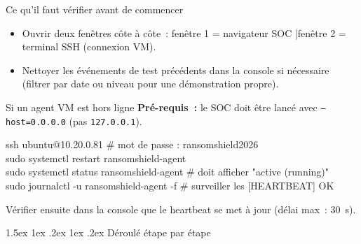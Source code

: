 \documentclass[a4paper,11pt]{article}
\makeatletter
\renewcommand{\section}{\@startsection{section}{1}{\z@}%
  {1.5ex \@plus 1ex \@minus .2ex}%
  {1ex \@plus .2ex}%
  {\large\bfseries\color{ifriblue}}}
\newcommand{\ok}{\textcolor{normgreen}{\faCheckCircle}\ }
\makeatother
\begin{document}
\begin{checkbox}{Ce qu'il faut vérifier avant de commencer}
\begin{itemize}[leftmargin=1.5em,itemsep=3pt]
  \item[\ok] Ouvrir deux fenêtres côte à côte~:
    fenêtre 1 = navigateur SOC \quad|\quad fenêtre 2 = terminal SSH (connexion VM).

  \item[\ok] Nettoyer les événements de test précédents dans la console si nécessaire
    (filtrer par date ou niveau pour une démonstration propre).
\end{itemize}
\end{checkbox}

\vspace{4pt}

\begin{warnbox}{Si un agent VM est hors ligne}
\textbf{Pré-requis~:} le SOC doit être lancé avec \texttt{--host=0.0.0.0} (pas \texttt{127.0.0.1}).
\begin{cmdbox}
ssh ubuntu@10.20.0.81     \# mot de passe : ransomshield2026\\
sudo systemctl restart ransomshield-agent\\
sudo systemctl status ransomshield-agent    \# doit afficher "active (running)"\\
sudo journalctl -u ransomshield-agent -f    \# surveiller les [HEARTBEAT] OK
\end{cmdbox}
Vérifier ensuite dans la console que le heartbeat se met à jour (délai max~: 30~s).
\end{warnbox}

\newpage

\section{Déroulé étape par étape}
\end{document}

